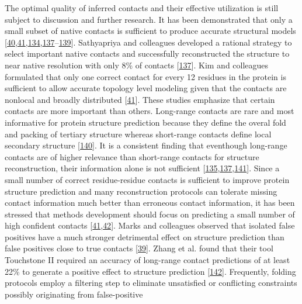 \documentclass[11pt,a4paper,twoside]{book}
\theoremstyle{definition}
\theoremstyle{definition}
\theoremstyle{remark}
\begin{document}
The optimal quality of inferred contacts and their effective utilization
is still subject to discussion and further research. It has been
demonstrated that only a small subset of native contacts is sufficient
to produce accurate structural models
{[}\protect\hyperlink{ref-Vendruscolo1997}{40},\protect\hyperlink{ref-Kim2014}{41},\protect\hyperlink{ref-Konopka2014}{134},\protect\hyperlink{ref-Sathyapriya2009}{137}--\protect\hyperlink{ref-Vassura2007}{139}{]}.
Sathyapriya and colleagues developed a rational strategy to select
important native contacts and successfully reconstructed the structure
to near native resolution with only 8\% of contacts
{[}\protect\hyperlink{ref-Sathyapriya2009}{137}{]}. Kim and colleagues
formulated that only one correct contact for every 12 residues in the
protein is sufficient to allow accurate topology level modeling given
that the contacts are nonlocal and broadly distributed
{[}\protect\hyperlink{ref-Kim2014}{41}{]}. These studies emphasize that
certain contacts are more important than others. Long-range contacts are
rare and most informative for protein structure prediction because they
define the overal fold and packing of tertiary structure whereas
short-range contacts define local secondary structure
{[}\protect\hyperlink{ref-Adhikari2017}{140}{]}. It is a consistent
finding that eventhough long-range contacts are of higher relevance than
short-range contacts for structure reconstruction, their information
alone is not sufficient
{[}\protect\hyperlink{ref-Kosciolek2014}{135},\protect\hyperlink{ref-Sathyapriya2009}{137},\protect\hyperlink{ref-DiLena2009a}{141}{]}.
Since a small number of correct residue-residue contacts is sufficient
to improve protein structure prediction and many reconstruction
protocols can tolerate missing contact information much better than
erroneous contact information, it has been stressed that methods
development should focus on predicting a small number of high confident
contacts
{[}\protect\hyperlink{ref-Kim2014}{41},\protect\hyperlink{ref-Duarte2010}{42}{]}.
Marks and colleagues observed that isolated false positives have a much
stronger detrimental effect on structure prediction than false positives
close to true contacts {[}\protect\hyperlink{ref-Marks2011}{39}{]}.
Zhang et al. found that their tool Touchstone II required an accuracy of
long-range contact predictions of at least 22\% to generate a positive
effect to structure prediction
{[}\protect\hyperlink{ref-Zhang2003}{142}{]}. Frequently, folding
protocols employ a filtering step to eliminate unsatisfied or
conflicting constraints possibly originating from false-positive
\end{document}
